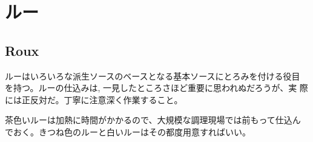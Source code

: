 \documentclass[twoside,12Q,b5j]{escoffierltjsbook}
\begin{document}
\section{ルー}\label{ux30ebux30fc}

\subsection{Roux}\label{roux}

 

ルーはいろいろな派生ソースのベースとなる基本ソースにとろみを付ける役目
を持つ。ルーの仕込みは, 一見したところさほど重要に思われぬだろうが、実
際には正反対だ。丁寧に注意深く作業すること。

茶色いルーは加熱に時間がかかるので、大規模な調理現場では前もって仕込ん
でおく。きつね色のルーと白いルーはその都度用意すればいい。

\vspace*{1.7\zw}
\end{document}
